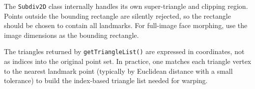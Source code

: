 \begin{remark}
    The \texttt{Subdiv2D} class internally handles its own super-triangle and
    clipping region.  Points outside the bounding rectangle are silently
    rejected, so the rectangle should be chosen to contain all landmarks.
    For full-image face morphing, use the image dimensions as the bounding
    rectangle.
\end{remark}

The triangles returned by \texttt{getTriangleList()} are expressed in
coordinates, not as indices into the original point set.  In practice, one
matches each triangle vertex to the nearest landmark point (typically by
Euclidean distance with a small tolerance) to build the index-based triangle
list needed for warping.
